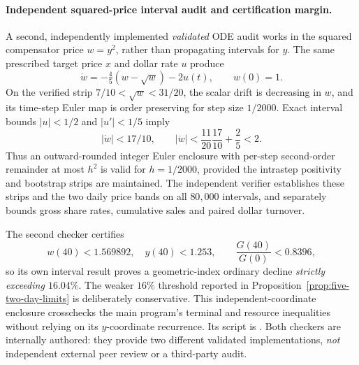 \documentclass[review,hidelinks,onefignum,onetabnum]{siamonline250211}
\begin{document}
\paragraph{Independent squared-price interval audit and certification margin.}
A second, independently implemented \emph{validated} ODE audit works in the squared compensator price $w=y^2$, rather than propagating intervals for $y$. The same prescribed target price $x$ and dollar rate $u$ produce
\[
\dot w=-\tfrac45(w-\sqrt w)-2u(t),\qquad w(0)=1.
\]
On the verified strip $7/10<\sqrt w<31/20$, the scalar drift is decreasing in $w$, and its time-step Euler map is order preserving for step size $1/2000$. Exact interval bounds $|u|<1/2$ and $|u'|<1/5$ imply
\[
|\dot w|<17/10,\qquad
|\ddot w|<
\frac{11}{20}\frac{17}{10}+\frac25<2.
\]
Thus an outward-rounded integer Euler enclosure with per-step second-order remainder at most $h^2$ is valid for $h=1/2000$, provided the intrastep positivity and bootstrap strips are maintained. The independent verifier establishes these strips and the two daily price bands on all $80{,}000$ intervals, and separately bounds gross share rates, cumulative sales and paired dollar turnover.

The second checker certifies
\begin{equation}\label{eq:independent-squared-endpoint}
 w(40)<1.569892,\quad y(40)<1.253,\qquad
 \frac{G(40)}{G(0)}<0.8396,
\end{equation}
so its own interval result proves a geometric-index ordinary decline \emph{strictly exceeding $16.04\%$}. The weaker $16\%$ threshold reported in Proposition~\ref{prop:five-two-day-limits} is deliberately conservative. This independent-coordinate enclosure crosschecks the main program's terminal and resource inequalities without relying on its $y$-coordinate recurrence. Its script is . Both checkers are internally authored: they provide two different validated implementations, \emph{not} independent external peer review or a third-party audit.


\enlargethispage{2\baselineskip}

\end{document}

